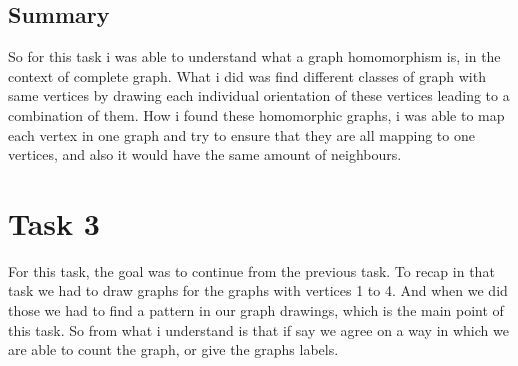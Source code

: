 \documentclass{Assignment}
\begin{document}
\subsection*{Summary}
So for this task i was able to understand what a graph homomorphism is, in the context of complete graph. What i did was find different classes of graph with same vertices by drawing each individual orientation of these vertices leading to a combination of them. How i found these homomorphic graphs, i was able to map each vertex in one graph and try to ensure that they are all mapping to one vertices, and also it would have the same amount of neighbours.\newpage
\section*{Task 3} 
For this task, the goal was to continue from the previous task. To recap in that task we had to draw graphs for the graphs with vertices 1 to 4. And when we did those we had to find a pattern in our graph drawings, which is the main point of this task. So from what i understand is that if say we agree on a way in which we are able to count the graph, or give the graphs labels.
\end{document}
